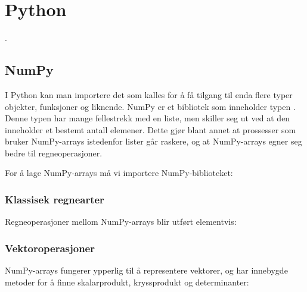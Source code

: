 





\section{Python}
.
\subsection{NumPy}
I Python kan man importere det som kalles  for å få tilgang til enda flere typer objekter, funksjoner og liknende. NumPy er et bibliotek som inneholder typen . Denne typen har mange fellestrekk med en liste, men skiller seg ut ved at den inneholder et bestemt antall elemener. Dette gjør blant annet at prossesser som bruker NumPy-arrays istedenfor lister går raskere, og at NumPy-arrays egner seg bedre til regneoperasjoner.\vsk

For å lage NumPy-arrays må vi importere NumPy-biblioteket: \regv
{}

\newpage
\subsubsection{Klassisek regnearter}
Regneoperasjoner mellom NumPy-arrays blir utført elementvis:
\subsubsection{Vektoroperasjoner}
NumPy-arrays fungerer ypperlig til å representere vektorer, og har innebygde metoder for å finne skalarprodukt, kryssprodukt og determinanter:\regv

	

